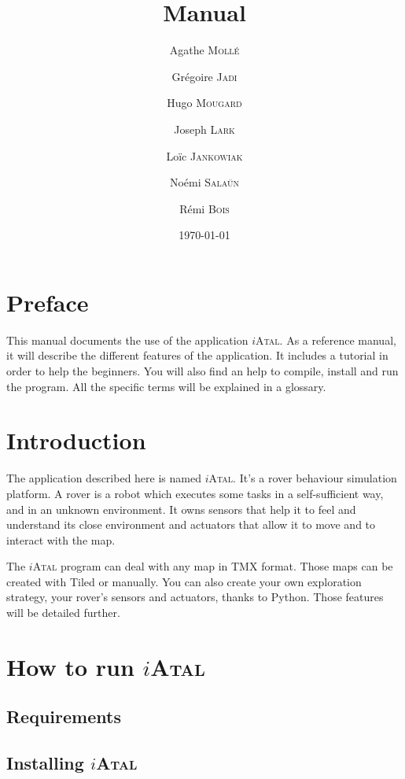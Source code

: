 \documentclass[a4paper,11pt]{article}
\title{\iAtal{} Manual}
\author{Agathe \textsc{Mollé}
  \and Grégoire \textsc{Jadi}
  \and Hugo \textsc{Mougard}
  \and Joseph \textsc{Lark} 
  \and Loïc \textsc{Jankowiak}
  \and Noémi \textsc{Salaün}
  \and Rémi \textsc{Bois}}
\date{\today}
\newcommand\iAtal{$i$\textsc{Atal}}
\begin{document}
\maketitle

\tableofcontents



\section*{Preface}
This manual documents the use of the application \iAtal{}.  As a
reference manual, it will describe the different features of the
application. It includes a tutorial in order to help the
beginners. You will also find an help to compile, install and run the
program.  All the specific terms will be explained in a glossary.
  
\section*{Introduction}
The application described here is named \iAtal{}. It's a rover behaviour
simulation platform.  A rover is a robot which executes some tasks in
a self-sufficient way, and in an unknown environment.  It owns sensors
that help it to feel and understand its close environment and
actuators that allow it to move and to interact with the map.


The \iAtal{} program can deal with any map in TMX\cite{tmx}
format. Those maps can be created with Tiled\cite{tiled} or manually.
You can also create your own exploration strategy, your rover's
sensors and actuators, thanks to Python.  Those features will be
detailed further.

\section{How to run \iAtal{}}

\subsection{Requirements}

\subsection{Installing \iAtal{}}
\end{document}
